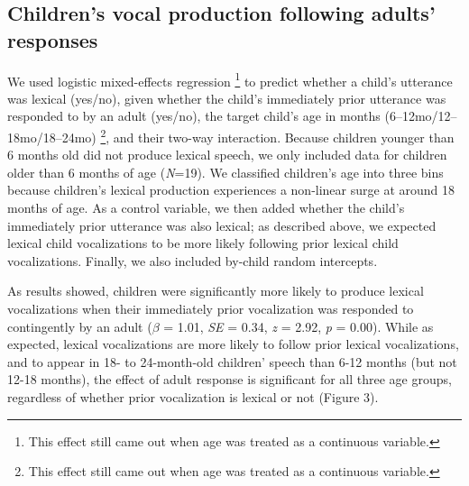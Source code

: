 \documentclass[
  man]{apa6}
\begin{document}
\hypertarget{childrens-vocal-production-following-adults-responses}{%
\subsection{Children's vocal production following adults' responses}\label{childrens-vocal-production-following-adults-responses}}

We used logistic mixed-effects regression \footnote{This effect still came out when age was treated as a continuous variable.} to predict whether a child's utterance was lexical (yes/no), given whether the child's immediately prior utterance was responded to by an adult (yes/no), the target child's age in months (6--12mo/12--18mo/18--24mo) \footnote{This effect still came out when age was treated as a continuous variable.}, and their two-way interaction. Because children younger than 6 months old did not produce lexical speech, we only included data for children older than 6 months of age (\emph{N}=19). We classified children's age into three bins because children's lexical production experiences a non-linear surge at around 18 months of age. As a control variable, we then added whether the child's immediately prior utterance was also lexical; as described above, we expected lexical child vocalizations to be more likely following prior lexical child vocalizations. Finally, we also included by-child random intercepts.

As results showed, children were significantly more likely to produce lexical vocalizations when their immediately prior vocalization was responded to contingently by an adult (\(\beta\) = 1.01, \emph{SE} = 0.34, \emph{z} = 2.92, \emph{p} = 0.00). While as expected, lexical vocalizations are more likely to follow prior lexical vocalizations, and to appear in 18- to 24-month-old children' speech than 6-12 months (but not 12-18 months), the effect of adult response is significant for all three age groups, regardless of whether prior vocalization is lexical or not (Figure 3).
\end{document}
